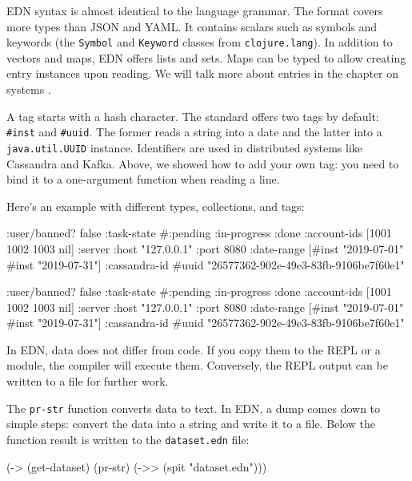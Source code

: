 EDN syntax is almost identical to the language grammar. The format covers more types than JSON and YAML. It contains scalars such as symbols and keywords (the \verb|Symbol| and \verb|Keyword| classes from \verb|clojure.lang|). In addition to vectors and maps, EDN offers lists and sets. Maps can be typed to allow creating entry instances upon reading. We will talk more about entries in the chapter on systems .


A tag starts with a hash character. The standard offers two tags by default: \verb|#inst| and \verb|#uuid|. The former reads a string into a date and the latter into a \verb|java.util.UUID| instance. Identifiers are used in distributed systems like Cassandra and Kafka. Above, we showed how to add your own tag: you need to bind it to a one-argument function when reading a line.

Here's an example with different types, collections, and tags:

\ifnarrow

\begin{clojure}
{:user/banned? false
 :task-state
 #{:pending :in-progress :done}
 :account-ids
 [1001 1002 1003 nil]
 :server
 {:host "127.0.0.1" :port 8080}
 :date-range
 [#inst "2019-07-01" #inst "2019-07-31"]
 :cassandra-id #uuid
 "26577362-902e-49e3-83fb-9106be7f60e1"}
\end{clojure}

\else

\begin{clojure}
{:user/banned? false
 :task-state #{:pending :in-progress :done}
 :account-ids [1001 1002 1003 nil]
 :server {:host "127.0.0.1" :port 8080}
 :date-range [#inst "2019-07-01" #inst "2019-07-31"]
 :cassandra-id #uuid "26577362-902e-49e3-83fb-9106be7f60e1"}
\end{clojure}

\fi

In EDN, data does not differ from code. If you copy them to the REPL or a module, the compiler will execute them. Conversely, the REPL output can be written to a file for further work.

The \verb|pr-str| function converts data to text. In EDN, a dump comes down to simple steps: convert the data into a string and write it to a file. Below the function result is written to the \verb|dataset.edn| file:

\begin{clojure}
(-> (get-dataset)
    (pr-str)
    (->> (spit "dataset.edn")))
\end{clojure}

